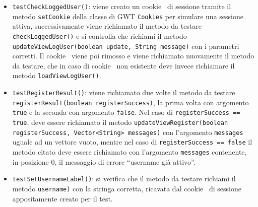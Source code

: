 {\begin{sloppypar}
{{\begin{itemize}
\begin{itemize}
{\begin{itemize}
						\item \texttt{testCheckLoggedUser()}: viene creato un cookie\g~ di sessione tramite il metodo \texttt{setCookie} della classe di GWT \texttt{Cookies} per simulare una sessione attiva, successivamente viene richiamato il metodo da testare \texttt{checkLoggedUser()} e si controlla che richiami il metodo \texttt{updateViewLogUser(boolean update, String message)} con i parametri corretti. Il cookie\g~ viene poi rimosso e viene richiamato nuovamente il metodo da testare, che in caso di cookie\g~ non esistente deve invece richiamare il metodo \texttt{loadViewLogUser()}.
						
						\item \texttt{testRegisterResult()}: viene richiamato due volte il metodo da testare \texttt{registerResult(boolean registerSuccess)}, la prima volta con argomento \texttt{true} e la seconda con argomento \texttt{false}. Nel caso di \texttt{registerSuccess == true}, deve essere richiamato il metodo \texttt{updateViewRegister(boolean registerSuccess, Vector<String> messages)} con l'argomento \texttt{messages} uguale ad un vettore vuoto, mentre nel caso di \texttt{registerSuccess == false} il metodo citato deve essere richiamato con l'argomento \texttt{messages} contenente, in posizione 0, il messaggio di errore ``username già attivo''.

						\item \texttt{testSetUsernameLabel()}: si verifica che il metodo da testare richiami il metodo  \texttt{username)} con la stringa corretta, ricavata dal cookie\g~ di sessione appositamente creato per il test.
						

\end{itemize}}
\end{itemize}
\end{itemize}}}
\end{sloppypar}}
